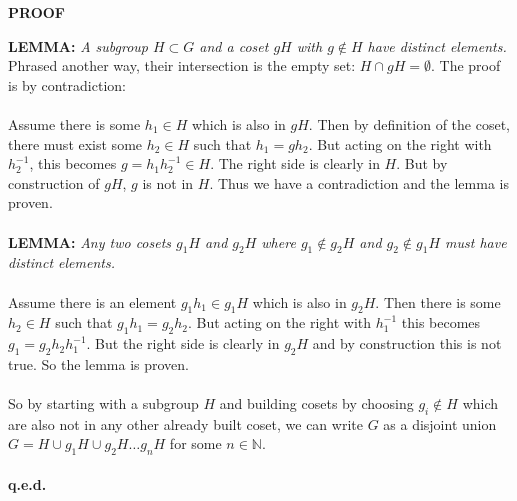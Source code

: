 \documentclass[9 pt]{report}
\begin{document}
\begin{center}
	\textbf{PROOF}
\end{center}
\textbf{LEMMA:} \emph{A subgroup $H\subset G$ and a coset $gH$ with $g\notin H$ have distinct elements.}
\\
Phrased another way, their intersection is the empty set: $H \cap gH = \emptyset$. The proof is by contradiction:
\\
\\
Assume there is some $h_1\in H$ which is also in $gH$. Then by definition of the coset, there must exist some $h_2\in H$ such that $h_1 = gh_2$. But acting on the right with $h_2^{-1}$, this becomes $g=h_1h_2^{-1}\in H$. The right side is clearly in $H$. But by construction of $gH$, $g$ is not in $H$. Thus we have a contradiction and the lemma is proven.
\\
\\
\textbf{LEMMA:} \emph{Any two cosets $g_1H$ and $g_2H$ where $g_1\notin g_2H$ and $g_2\notin g_1H$ must have distinct elements.}
\\
\\
Assume there is an element $g_1 h_1 \in g_1H$ which is also in $g_2H$. Then there is some $h_2\in H$ such that $g_1h_1 = g_2h_2$. But acting on the right with $h_1^{-1}$ this becomes $g_1 = g_2h_2h_1^{-1}$. But the right side is clearly in $g_2H$ and by construction this is not true. So the lemma is proven.
\\
\\
So by starting with a subgroup $H$ and building cosets by choosing $g_i\notin H$ which are also not in any other already built coset, we can write $G$ as a disjoint union $G = H \cup g_1H \cup g_2H \dots g_nH$ for some $n\in \mathbb{N}$.
\\
\\
\textbf{q.e.d.}
\end{document}

